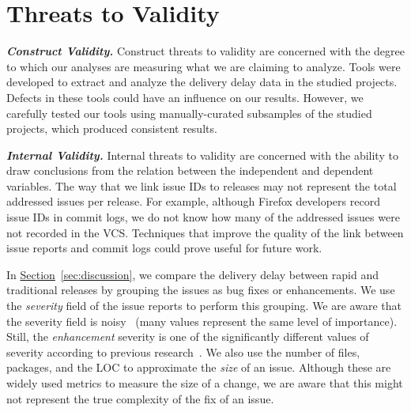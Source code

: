\section{Threats to Validity} \label{sec:threats}

\textbf{\textit{Construct Validity.}} Construct threats to validity are
concerned with the degree to which our analyses are measuring what we are
claiming to analyze. Tools were developed to extract and analyze the
delivery delay data in the studied projects. Defects in these tools could have an
influence on our results. However, we carefully tested our tools using
manually-curated subsamples of the studied projects, which produced consistent
results.

\textbf{\textit{Internal Validity.}} Internal threats to validity are concerned
with the ability to draw conclusions from the relation between the independent
and dependent variables. The way that we link issue IDs to releases may not
represent the total addressed issues per release. For example, although Firefox
developers record issue IDs in commit logs, we do not know how many of the
addressed issues were not recorded in the VCS. Techniques that improve the
quality of the link between issue reports and commit logs could prove useful for
future work.

In \hyperref[sec:discussion]{Section}~\ref{sec:discussion}, we compare the
delivery delay between rapid and traditional releases by grouping the issues
as bug fixes or enhancements. We use the \textit{severity} field of the issue
reports to perform this grouping.  We are aware that the severity field is
noisy~\cite{Herraiz2008,tian2015unreliability} (\ie many values represent the
same level of importance). Still, the \textit{enhancement} severity is one of
the significantly different values of severity according to previous
research~\cite{Herraiz2008}. We also use the number of files, packages, and the
LOC to approximate the \textit{size} of an issue. Although these are widely used
metrics to measure the size of a change, we are aware that this might not
represent the true complexity of the fix of an issue.
%

